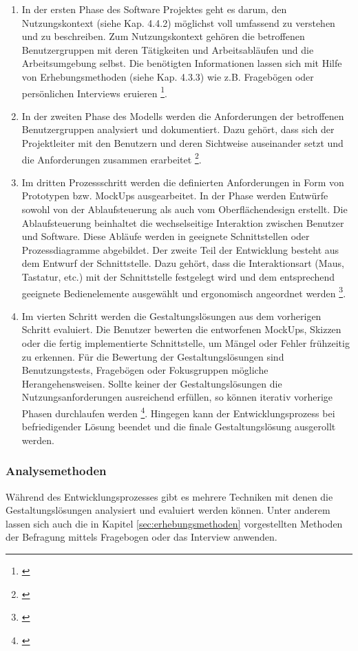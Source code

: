 \begin{enumerate}
    \item In der ersten Phase des Software Projektes geht es darum, den Nutzungskontext (siehe Kap. 4.4.2) möglichst voll umfassend zu verstehen und zu beschreiben. Zum Nutzungskontext gehören die betroffenen Benutzergruppen mit deren Tätigkeiten und Arbeitsabläufen und die Arbeitsumgebung selbst. Die benötigten Informationen lassen sich mit Hilfe von Erhebungsmethoden (siehe Kap. 4.3.3) wie z.B. Fragebögen oder persönlichen Interviews eruieren \footnote{\cite[vgl.][28\psq]{Ecker2016}}.
    \item In der zweiten Phase des Modells werden die Anforderungen der betroffenen Benutzergruppen analysiert und dokumentiert. Dazu gehört, dass sich der Projektleiter mit den Benutzern und deren Sichtweise auseinander setzt und die Anforderungen zusammen erarbeitet \footnote{\cite[vgl.][30\psq]{Ecker2016}}.
    \item Im dritten Prozessschritt werden die definierten Anforderungen in Form von Prototypen bzw. MockUps ausgearbeitet. In der Phase werden Entwürfe sowohl von der Ablaufsteuerung als auch vom Oberflächendesign erstellt. Die Ablaufsteuerung beinhaltet die wechselseitige Interaktion zwischen Benutzer und Software. Diese Abläufe werden in geeignete Schnittstellen oder Prozessdiagramme abgebildet. Der zweite Teil der Entwicklung besteht aus dem Entwurf der Schnittstelle. Dazu gehört, dass die Interaktionsart (Maus, Tastatur, etc.) mit der Schnittstelle festgelegt wird und dem entsprechend geeignete Bedienelemente ausgewählt und ergonomisch angeordnet werden \footnote{\cite[vgl.][33\psq]{Ecker2016}}.
    \item Im vierten Schritt werden die Gestaltungslösungen aus dem vorherigen Schritt evaluiert. Die Benutzer bewerten die entworfenen MockUps, Skizzen oder die fertig implementierte Schnittstelle, um Mängel oder Fehler frühzeitig zu erkennen. Für die Bewertung der Gestaltungslösungen sind Benutzungstests, Fragebögen oder Fokusgruppen mögliche Herangehensweisen. Sollte keiner der Gestaltungslösungen die Nutzungsanforderungen ausreichend erfüllen, so können iterativ vorherige Phasen durchlaufen werden \footnote{\cite[vgl.][34\psq]{Ecker2016}}. Hingegen kann der Entwicklungsprozess bei befriedigender Lösung beendet und die finale Gestaltungslösung ausgerollt werden.
\end{enumerate}

\subsubsection{Analysemethoden}
\label{sec:analysemethoden}
Während des Entwicklungsprozesses gibt es mehrere Techniken mit denen die Gestaltungslösungen analysiert und evaluiert werden können. Unter anderem lassen sich auch die in Kapitel \ref{sec:erhebungsmethoden} vorgestellten Methoden der Befragung mittels Fragebogen oder das Interview anwenden. 

